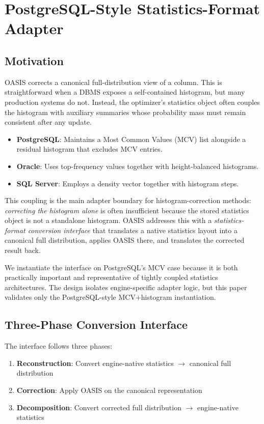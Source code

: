 \section{PostgreSQL-Style Statistics-Format Adapter}
\label{sec:mcv-adapter-app}

\subsection{Motivation}

OASIS corrects a canonical full-distribution view of a column. This is
straightforward when a DBMS exposes a self-contained histogram, but many
production systems do not. Instead, the optimizer's statistics object often
couples the histogram with auxiliary summaries whose probability mass must
remain consistent after any update.

\begin{itemize}
    \item \textbf{PostgreSQL}: Maintains a Most Common Values (MCV) list alongside a residual histogram that excludes MCV entries.
    \item \textbf{Oracle}: Uses top-frequency values together with height-balanced histograms.
    \item \textbf{SQL Server}: Employs a density vector together with histogram steps.
\end{itemize}

This coupling is the main adapter boundary for histogram-correction methods:
\emph{correcting the histogram alone} is often insufficient because the stored
statistics object is not a standalone histogram. OASIS addresses this with a
\emph{statistics-format conversion interface} that translates a native
statistics layout into a canonical full distribution, applies OASIS there, and
translates the corrected result back.

We instantiate the interface on PostgreSQL's MCV case because it is both
practically important and representative of tightly coupled statistics
architectures. The design isolates engine-specific adapter logic, but this
paper validates only the PostgreSQL-style MCV+histogram instantiation.

\subsection{Three-Phase Conversion Interface}

The interface follows three phases:

\begin{enumerate}
    \item \textbf{Reconstruction}: Convert engine-native statistics $\rightarrow$ canonical full distribution
    \item \textbf{Correction}: Apply OASIS on the canonical representation
    \item \textbf{Decomposition}: Convert corrected full distribution $\rightarrow$ engine-native statistics
\end{enumerate}

